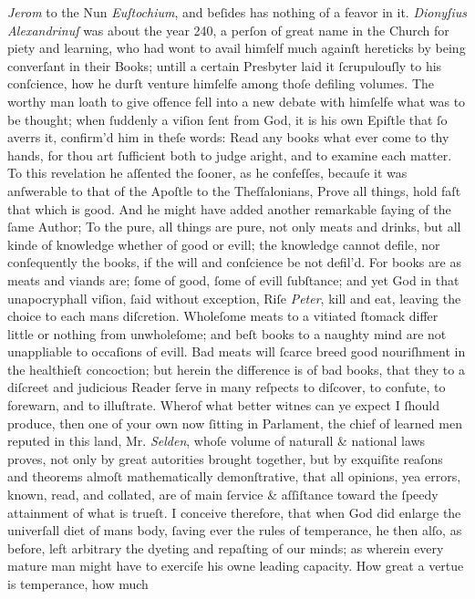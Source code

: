 \textit{Jerom} to the Nun \textit{Euſtochium}, and beſides has nothing of a
feavor in it.  \textit{Dionyſius Alexandrinuſ} was about the year 240, a perſon
of great name in the Church for piety and learning, who had wont to avail
himſelf much againſt hereticks by being converſant in their Books; untill a
certain Presbyter laid it ſcrupulouſly to his conſcience, how he durſt venture
himſelfe among thoſe defiling volumes.  The worthy man loath to give offence
fell into a new debate with himſelfe what was to be thought; when ſuddenly a
viſion ſent from God, it is his own Epiſtle that ſo averrs it, confirm'd him in
theſe words: Read any books what ever come to thy hands, for thou art ſufficient
both to judge aright, and to examine each matter.  To this revelation he
aſſented the ſooner, as he confeſſes, becauſe it was anſwerable to that of the
Apoſtle to the Theſſalonians, Prove all things, hold faſt that which is good.
And he might have added another remarkable ſaying of the ſame Author; To the
pure, all things are pure, not only meats and drinks, but all kinde of knowledge
whether of good or evill; the knowledge cannot defile, nor conſequently the
books, if the will and conſcience be not defil'd.  For books are as meats and
viands are; ſome of good, ſome of evill ſubſtance; and yet God in that
unapocryphall viſion, ſaid without exception, Riſe \textit{Peter}, kill and eat,
leaving the choice to each mans diſcretion.  Wholeſome meats to a vitiated
ſtomack differ little or nothing from unwholeſome; and beſt books to a naughty
mind are not unappliable to occaſions of evill.  Bad meats will ſcarce breed
good nouriſhment in the healthieſt concoction; but herein the difference is of
bad books, that they to a diſcreet and judicious Reader ſerve in many reſpects
to diſcover, to confute, to forewarn, and to illuſtrate.  Wherof what better
witnes can ye expect I ſhould produce, then one of your own now ſitting in
Parlament, the chief of learned men reputed in this land, Mr. \textit{Selden},
whoſe volume of naturall \& national laws proves, not only by great autorities
brought together, but by exquiſite reaſons and theorems almoſt mathematically
demonſtrative, that all opinions, yea errors, known, read, and collated, are of
main ſervice \& aſſiſtance toward the ſpeedy attainment of what is trueſt.  I
conceive therefore, that when God did enlarge the univerſall diet of mans body,
ſaving ever the rules of temperance, he then alſo, as before, left arbitrary the
dyeting and repaſting of our minds; as wherein every mature man might have to
exerciſe his owne leading capacity.  How great a vertue is temperance, how much
